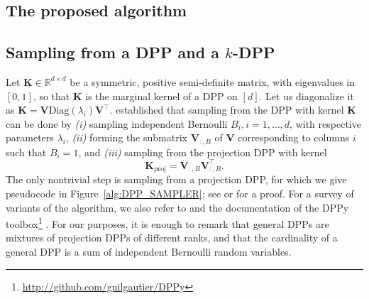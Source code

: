 \documentclass[twoside,11pt]{book}
\newcommand{\rev}[1]{\textcolor{darkgreen}{#1}}
\numberwithin{theorem}{chapter}
\numberwithin{definition}{chapter}
\numberwithin{proposition}{chapter}
\numberwithin{corollary}{chapter}
\numberwithin{example}{chapter}
\numberwithin{lemma}{chapter}
\DeclareMathOperator{\Span}{\mathrm{Span}}
\DeclareMathOperator{\Tran}{\intercal}
\newcommand{\ar}[1]{\textcolor{magenta}{~\algoremark{#1}}}
\begin{document}

\subsection{The proposed algorithm}



\subsection{Sampling from a DPP and a $k$-DPP}
\label{subsec:sampling_from_a_dpp}
Let $\bm{K}\in\mathbb{R}^{d\times d}$ be a symmetric, positive semi-definite matrix, with eigenvalues in $[0,1]$, so that $\bm{K}$ is the marginal kernel of a DPP on $[d]$. Let us diagonalize it as $\bm{K} = \bm{V}\text{Diag}(\lambda_i)\bm{V}^{\Tran}$. \cite{HoKrPeVi06} established that sampling from the DPP with kernel $\bm K$ can be done by \emph{(i)} sampling independent Bernoulli $B_i, i=1,\dots,d$, with respective parameters $\lambda_i$, \emph{(ii)} forming the submatrix $\bm V_{:,B}$ of $\bm V$ corresponding to columns $i$ such that $B_i=1$, and \emph{(iii)} sampling from the projection DPP with kernel
$$\bm{K}_\text{proj} = \bm{V}_{:,B}\bm{V}_{:,B}^{\Tran}.$$
The only nontrivial step is sampling from a projection DPP, for which we give pseudocode in Figure~\ref{alg:DPP_SAMPLER}; see \cite[Theorem 7]{HoKrPeVi06} or \cite[Theorem 2.3]{KuTa12} for a proof. For a survey of variants of the algorithm, we also refer to \citep*{TrBaAm18} and the documentation of the DPPy toolbox\footnote{\url{http://github.com/guilgautier/DPPy}} \citep*{GaBaVa18}. For our purposes, it is enough to remark that general DPPs are mixtures of projection DPPs of different ranks, and that the cardinality of a general DPP is a sum of independent Bernoulli random variables.

\end{document}
